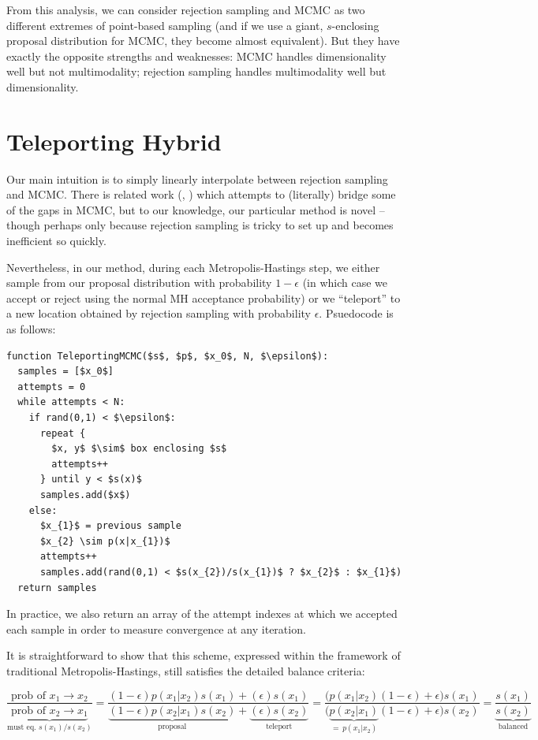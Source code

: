 \documentclass{article}
\begin{document}
From this analysis, we can consider rejection sampling and MCMC as two
different extremes of point-based sampling (and if we use a giant,
$s$-enclosing proposal distribution for MCMC, they become almost
equivalent). But they have exactly the opposite strengths and weaknesses: MCMC
handles dimensionality well but not multimodality; rejection sampling handles
multimodality well but dimensionality.

\section{Teleporting Hybrid}

Our main intuition is to simply linearly interpolate between rejection sampling
and MCMC. There is related work (\cite{wormhole}, \cite{darting}) which
attempts to (literally) bridge some of the gaps in MCMC, but to our knowledge,
our particular method is novel -- though perhaps only because rejection
sampling is tricky to set up and becomes inefficient so quickly.

Nevertheless, in our method, during each Metropolis-Hastings step, we either
sample from our proposal distribution with probability $1-\epsilon$ (in
which case we accept or reject using the normal MH acceptance probability) or
we ``teleport'' to a new location obtained by rejection sampling with probability
$\epsilon$. Psuedocode is as follows:

\begin{lstlisting}[mathescape=true]
function TeleportingMCMC($s$, $p$, $x_0$, N, $\epsilon$):
  samples = [$x_0$]
  attempts = 0
  while attempts < N:
    if rand(0,1) < $\epsilon$:
      repeat {
        $x, y$ $\sim$ box enclosing $s$
        attempts++
      } until y < $s(x)$
      samples.add($x$)
    else:
      $x_{1}$ = previous sample
      $x_{2} \sim p(x|x_{1})$
      attempts++
      samples.add(rand(0,1) < $s(x_{2})/s(x_{1})$ ? $x_{2}$ : $x_{1}$)
  return samples
\end{lstlisting}

In practice, we also return an array of the attempt indexes at which we
accepted each sample in order to measure convergence at any iteration.

It is straightforward to show that this scheme, expressed within the framework
of traditional Metropolis-Hastings, still satisfies the detailed balance
criteria:

$$ \frac{\text{prob of }x_1\to x_2}{\underbrace{\text{prob of }x_2\to
x_1}_{\text{must eq. $s(x_1)/s(x_2)$}}} = \frac{(1-\epsilon)p(x_1|x_2)s(x_1) +
(\epsilon) s(x_1)}{\underbrace{(1-\epsilon)p(x_2|x_1)s(x_2)}_{\text{proposal}}
+ \underbrace{(\epsilon) s(x_2)}_{\text{teleport}}} = \frac{
\big(p(x_1|x_2)(1-\epsilon) + \epsilon\big)s(x_1) }{ \big(
\underbrace{p(x_2|x_1)}_{=\, p(x_1|x_2)}(1-\epsilon) + \epsilon\big) s(x_2) } =
\underbrace{\frac{s(x_1)}{s(x_2)}}_{\text{balanced}} $$
\end{document}
